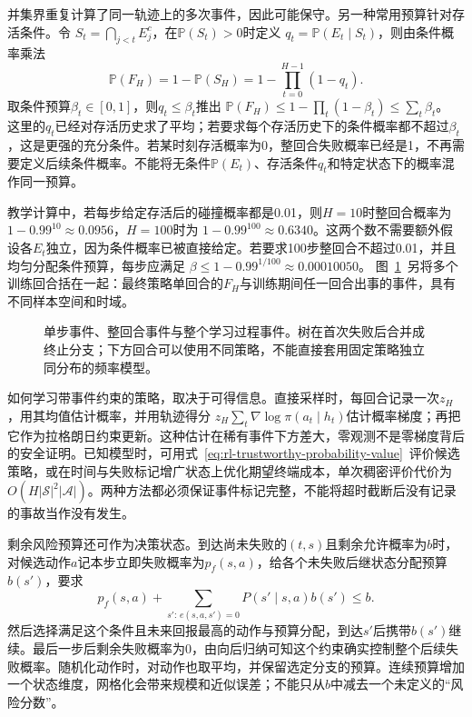 并集界重复计算了同一轨迹上的多次事件，因此可能保守。另一种常用预算针对存活条件。令
$S_t=\bigcap_{j<t}E_j^c$，在$\mathbb P(S_t)>0$时定义
$q_t=\mathbb P(E_t\mid S_t)$，则由条件概率乘法
\[
  \mathbb P(F_H)=1-\mathbb P(S_H)
       =1-\prod_{t=0}^{H-1}(1-q_t).
\]
取条件预算$\beta_t\in[0,1]$，则$q_t\leq\beta_t$推出
$\mathbb P(F_H)\leq1-\prod_t(1-\beta_t)\leq\sum_t\beta_t$。
这里的$q_t$已经对存活历史求了平均；若要求每个存活历史下的条件概率都不超过$\beta_t$，这是更强的充分条件。若某时刻存活概率为0，整回合失败概率已经是1，不再需要定义后续条件概率。不能将无条件$\mathbb P(E_t)$、存活条件$q_t$和特定状态下的概率混作同一预算。

教学计算中，若每步给定存活后的碰撞概率都是0.01，则$H=10$时整回合概率为
$1-0.99^{10}\approx0.0956$，$H=100$时为
$1-0.99^{100}\approx0.6340$。这两个数不需要额外假设各$E_t$独立，因为条件概率已被直接给定。若要求100步整回合不超过0.01，并且均匀分配条件预算，每步应满足
$\beta\leq1-0.99^{1/100}\approx0.00010050$。
图~\ref{fig:rl-trustworthy-events}~另将多个训练回合括在一起：最终策略单回合的$F_H$与训练期间任一回合出事的事件，具有不同样本空间和时域。

\begin{figure}[htbp]
  \centering
  
  \caption{单步事件、整回合事件与整个学习过程事件。树在首次失败后合并成终止分支；下方回合可以使用不同策略，不能直接套用固定策略独立同分布的频率模型。}
  \label{fig:rl-trustworthy-events}
\end{figure}

如何学习带事件约束的策略，取决于可得信息。直接采样时，每回合记录一次$z_H$，用其均值估计概率，并用轨迹得分
$z_H\sum_t\nabla\log\pi(a_t\mid h_t)$估计概率梯度；再把它作为拉格朗日约束更新。这种估计在稀有事件下方差大，零观测不是零梯度背后的安全证明。已知模型时，可用式~\eqref{eq:rl-trustworthy-probability-value}~评价候选策略，或在时间与失败标记增广状态上优化期望终端成本，单次稠密评价代价为$O(H|\mathcal S|^2|\mathcal A|)$。两种方法都必须保证事件标记完整，不能将超时截断后没有记录的事故当作没有发生。

剩余风险预算还可作为决策状态。到达尚未失败的$(t,s)$且剩余允许概率为$b$时，对候选动作$a$记本步立即失败概率为$p_f(s,a)$，给各个未失败后继状态分配预算$b(s')$，要求
\begin{equation}
  p_f(s,a)+
    \sum_{s':\,e(s,a,s')=0}P(s'\mid s,a)b(s')\leq b.
  \label{eq:rl-trustworthy-risk-budget}
\end{equation}
然后选择满足这个条件且未来回报最高的动作与预算分配，到达$s'$后携带$b(s')$继续。最后一步后剩余失败概率为0，由向后归纳可知这个约束确实控制整个后续失败概率。随机化动作时，对动作也取平均，并保留选定分支的预算。连续预算增加一个状态维度，网格化会带来规模和近似误差；不能只从$b$中减去一个未定义的“风险分数”。

